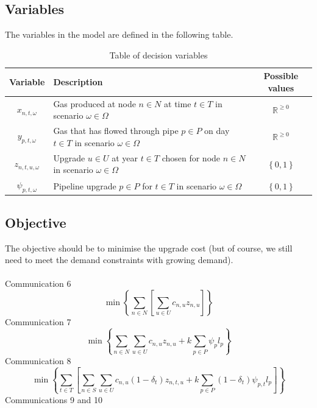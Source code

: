 \documentclass{article}
\begin{document}
\subsection{Variables}
\bigskip
The variables in the model are defined in the following table.

\renewcommand\baselinestretch{1.5}
\begin{table}[htb]
    \centering
    \color{black}
    \begin{tabular}{|c:l:c|}
        \hline
        \textbf{Variable} & \textbf{Description} & \textbf{Possible values} \\
        \hline
        \(x_{n,t,\omega}\) & Gas produced at node \(n \in N\) at time \(t \in T\) in scenario \(\omega \in \Omega\) & \(\mathbb{R}^{\geq 0}\) \\ \hdashline
        \(y_{p,t,\omega}\) & Gas that has flowed through pipe \(p\in P\) on day \(t \in T\) in scenario \(\omega \in \Omega\) & \(\mathbb{R}^{\geq 0}\) \\ \hdashline
        \(z_{n,t,u,\omega}\) & Upgrade \(u \in U\) at year \(t \in T\) chosen for node \(n \in N\) in scenario \(\omega \in \Omega\) & \(\left\{0, 1\right\}\) \\ \hdashline
        \(\psi_{p,t,\omega}\) & Pipeline upgrade \(p \in P\) for \(t\in T\) in scenario \(\omega \in \Omega\) & \(\left\{0, 1\right\}\) \\
        \hline
    \end{tabular}
    \caption{Table of decision variables}
    \label{tab:vars}
\end{table}
\renewcommand\baselinestretch{1}
\bigskip
\subsection{Objective}
\bigskip
The objective should be to minimise the upgrade cost (but of course, we still need to meet the demand constraints with growing demand).\\
\\
Communication 6
\[\min{\left\{\sum_{n\in N}\left[\sum_{u \in U}c_{n,u} z_{n,u}\right]\right\}}\]
\smallskip\noindent
Communication 7
\[\min{\left\{\sum_{n\in N}\sum_{u \in U}c_{n,u} z_{n,u} + k \sum_{p \in P}\psi_p l_p\right\}}\]
\smallskip\noindent
Communication 8
\smallskip\noindent
\[\min{\left\{\sum_{t\in T}\left[\sum_{n\in S}\sum_{u \in U}c_{n,u}  (1 - \delta_{t}) z_{n,t,u} + k \sum_{p \in P}(1 - \delta_{t})\psi_{p,t} l_p\right]\right\}}\]
\smallskip\noindent
Communications 9 and 10
\end{document}
